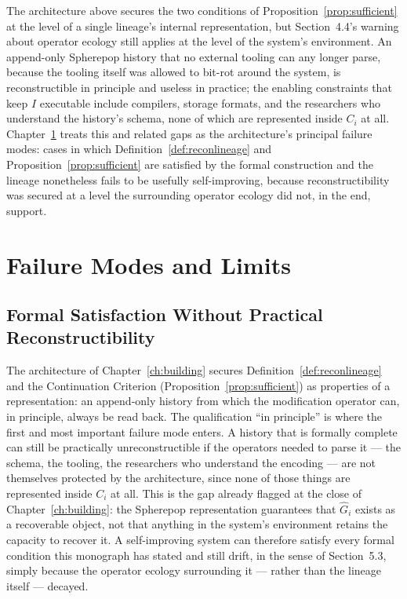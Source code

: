 \documentclass[11pt]{book}
\begin{document}
The architecture above secures the two conditions of Proposition~\ref{prop:sufficient} at the level of a single lineage's internal representation, but Section~4.4's warning about operator ecology still applies at the level of the system's environment. An append-only Spherepop history that no external tooling can any longer parse, because the tooling itself was allowed to bit-rot around the system, is reconstructible in principle and useless in practice; the enabling constraints that keep $I$ executable include compilers, storage formats, and the researchers who understand the history's schema, none of which are represented inside $C_i$ at all. Chapter~\ref{ch:failure} treats this and related gaps as the architecture's principal failure modes: cases in which Definition~\ref{def:reconlineage} and Proposition~\ref{prop:sufficient} are satisfied by the formal construction and the lineage nonetheless fails to be usefully self-improving, because reconstructibility was secured at a level the surrounding operator ecology did not, in the end, support.

\chapter{Failure Modes and Limits}
\label{ch:failure}

\section{Formal Satisfaction Without Practical Reconstructibility}

The architecture of Chapter~\ref{ch:building} secures Definition~\ref{def:reconlineage} and the Continuation Criterion (Proposition~\ref{prop:sufficient}) as properties of a representation: an append-only history from which the modification operator can, in principle, always be read back. The qualification ``in principle'' is where the first and most important failure mode enters. A history that is formally complete can still be practically unreconstructible if the operators needed to parse it --- the schema, the tooling, the researchers who understand the encoding --- are not themselves protected by the architecture, since none of those things are represented inside $C_i$ at all. This is the gap already flagged at the close of Chapter~\ref{ch:building}: the Spherepop representation guarantees that $\widehat{G}_i$ exists as a recoverable object, not that anything in the system's environment retains the capacity to recover it. A self-improving system can therefore satisfy every formal condition this monograph has stated and still drift, in the sense of Section~5.3, simply because the operator ecology surrounding it --- rather than the lineage itself --- decayed.
\end{document}
